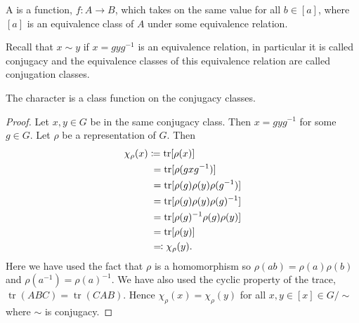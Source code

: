 \documentclass[fleqn]{NotesClass}
\DeclareMathOperator{\tr}{tr}
\begin{document}
    \begin{dfn}{}{}
        A  is a function, \(f \colon A \to B\), which takes on the same value for all \(b \in [a]\), where \([a]\) is an equivalence class of \(A\) under some equivalence relation.
    \end{dfn}
    
    Recall that \(x \sim y\) if \(x = gyg^{-1}\) is an equivalence relation, in particular it is called conjugacy and the equivalence classes of this equivalence relation are called conjugation classes.
    
    \begin{lma}{}{}
        The character is a class function on the conjugacy classes.
        
        \begin{proof}
            Let \(x, y \in G\) be in the same conjugacy class.
            Then \(x = gyg^{-1}\) for some \(g \in G\).
            Let \(\rho\) be a representation of \(G\).
            Then
            \begin{align}
                \chi_{\rho}(x) &\coloneqq \tr[\rho(x)]\\
                &\hphantom{:}= \tr[\rho(gxg^{-1})]\\
                &\hphantom{:}= \tr[\rho(g)\rho(y)\rho(g^{-1})]\\
                &\hphantom{:}= \tr[\rho(g)\rho(y)\rho(g)^{-1}]\\
                &\hphantom{:}= \tr[\rho(g)^{-1}\rho(g)\rho(y)]\\
                &\hphantom{:}= \tr[\rho(y)]\\
                &\hphantom{:}\eqqcolon \chi_\rho(y).
            \end{align}
            Here we have used the fact that \(\rho\) is a homomorphism so \(\rho(ab) = \rho(a)\rho(b)\) and \(\rho(a^{-1}) = \rho(a)^{-1}\).
            We have also used the cyclic property of the trace, \(\tr(ABC) = \tr(CAB)\).
            Hence \(\chi_\rho(x) = \chi_\rho(y)\) for all \(x, y \in [x] \in G/\sim\) where \(\sim\) is conjugacy.
        \end{proof}
    \end{lma}
    
\end{document}
